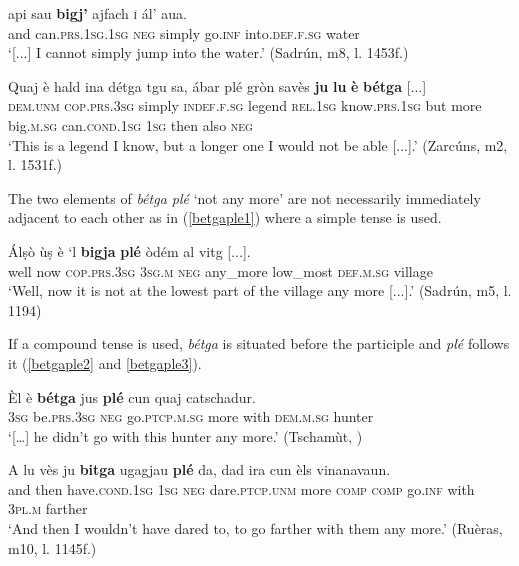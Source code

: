 \ea\label{ex:negbetg8}
\gll  [...] api sau \textbf{bigj’} ajfach \textsc{í} ál’ aua.\\
{} and can.\textsc{prs.1sg.1sg} \textsc{neg} simply go.\textsc{inf} into.\textsc{def.f.sg} water\\
\medskip
\glt `[...] I cannot simply jump into the water.' (Sadrún, m8, l. 1453f.)
\z

\ea
\label{ex:negbetg9}
\gll    Quaj è hald ina détga tgu sa, ábar plé gròn savès \textbf{ju} \textbf{lu} \textbf{è} \textbf{bétga} [...]\\
\textsc{dem.unm} \textsc{cop.prs.3sg} simply \textsc{indef.f.sg} legend \textsc{rel.1sg} know.\textsc{prs.1sg} but more big.\textsc{m.sg} can.\textsc{cond.1sg} \textsc{1sg} then also \textsc{neg}\\
\glt `This is a legend I know, but a longer one I would not be able [...].' (Zarcúns, m2, l. 1531f.)
\z

The two elements of \textit{bétga plé} `not any more' are not necessarily immediately adjacent to each other as in (\ref{betgaple1}) where a simple tense is used.

\ea
\label{betgaple1}
\gll  Álṣò ùṣ è `l \textbf{bigja} \textbf{plé} òdém al vitg [...]. \\
well now  \textsc{cop.prs.3sg} \textsc{3sg.m} \textsc{neg} any\_more low\_most \textsc{def.m.sg} village\\
\glt `Well, now it is not at the lowest part of the village any more [...].' (Sadrún, m5, l. 1194)
\z

If a compound tense is used, \textit{bétga} is situated before the participle and \textit{plé} follows it (\ref{betgaple2} and \ref{betgaple3}).

\ea
\label{betgaple2}
\gll   Èl è \textbf{bétga} jus \textbf{plé} cun quaj catschadur. \\
\textsc{3sg} be.\textsc{prs.3sg} \textsc{neg} go.\textsc{ptcp.m.sg} more with \textsc{dem.m.sg} hunter\\
\glt `[…] he didn’t go with this hunter any more.' (Tschamùt, \citealt[12]{Büchli1966})
\z

\ea\label{betgaple3}
\gll  A lu vès ju \textbf{bitga} ugagjau \textbf{plé} da, dad ira cun èls vinanavaun.\\
and then have.\textsc{cond.1sg} \textsc{1sg} \textsc{neg} dare.\textsc{ptcp.unm} more \textsc{comp} \textsc{comp} go.\textsc{inf} with \textsc{3pl.m} farther\\
\glt `And then I wouldn’t have dared to, to go farther with them any more.' (Ruèras, m10, l. 1145f.)
\z

